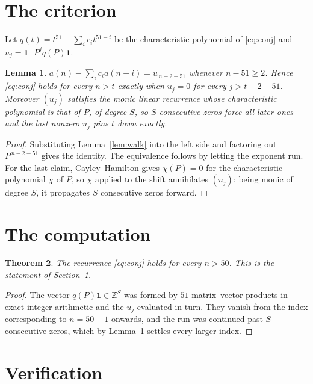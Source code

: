 \documentclass[11pt,a4paper]{article}
\theoremstyle{plain}
\newtheorem{theorem}{Theorem}
\newtheorem{lemma}[theorem]{Lemma}
\theoremstyle{definition}
\begin{document}
\section{The criterion}

Let $q(t)=t^{51}-\sum_i c_i t^{51-i}$ be the characteristic polynomial of
\eqref{eq:conj} and $u_j=\mathbf{1}^{\!\top}P^{j}q(P)\mathbf{1}$.

\begin{lemma}\label{lem:crit}
$a(n)-\sum_i c_i a(n-i)=u_{\,n-2-51}$ whenever $n-51\ge2$. Hence
\eqref{eq:conj} holds for every $n>t$ exactly when $u_j=0$ for every
$j>t-2-51$. Moreover $(u_j)$ satisfies the monic linear recurrence whose
characteristic polynomial is that of $P$, of degree $S$, so $S$ consecutive zeros force all
later ones and the last nonzero $u_j$ pins $t$ down exactly.
\end{lemma}

\begin{proof}
Substituting Lemma~\ref{lem:walk} into the left side and factoring out
$P^{\,n-2-51}$ gives the identity. The equivalence follows by letting the exponent
run. For the last claim, Cayley--Hamilton gives $\chi(P)=0$ for the characteristic
polynomial $\chi$ of $P$, so $\chi$ applied to the shift annihilates $(u_j)$; being monic of
degree $S$, it propagates $S$ consecutive zeros forward.
\end{proof}

\section{The computation}

\begin{theorem}
The recurrence \eqref{eq:conj} holds for every $n>50$. This is the statement of
Section~1.
\end{theorem}

\begin{proof}
The vector $q(P)\mathbf{1}\in\mathbb{Z}^{S}$ was formed by $51$ matrix--vector
products in exact integer arithmetic and the $u_j$ evaluated in turn. They vanish from the
index corresponding to $n=50+1$ onwards, and the run was continued past $S$ consecutive
zeros, which by Lemma~\ref{lem:crit} settles every larger index.
\end{proof}

\section{Verification}
\end{document}
